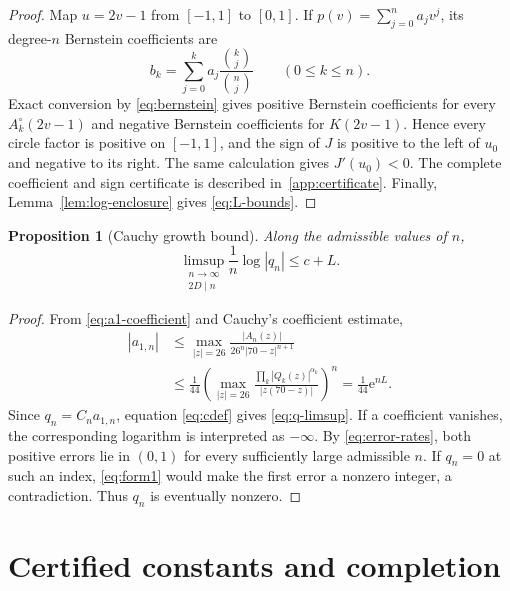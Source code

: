 \documentclass[preprint,12pt]{elsarticle}
\newtheorem{proposition}[theorem]{Proposition}
\theoremstyle{definition}
\newcommand{\e}{\mathrm e}
\begin{document}
\begin{proof}
Map $u=2v-1$ from $[-1,1]$ to $[0,1]$.  If
$p(v)=\sum_{j=0}^n a_j v^j$, its degree-$n$ Bernstein coefficients are
\begin{equation}\label{eq:bernstein}
 b_k=\sum_{j=0}^k a_j
 \frac{\binom{k}{j}}{\binom{n}{j}}
 \qquad(0\le k\le n).
\end{equation}
Exact conversion by \eqref{eq:bernstein} gives positive Bernstein
coefficients for every $A_k^\circ(2v-1)$ and negative Bernstein coefficients
for $K(2v-1)$.  Hence every circle factor is positive on $[-1,1]$, and the
sign of $J$ is positive to the left of $u_0$ and negative to its right.
The same calculation gives $J'(u_0)<0$.  The complete coefficient and sign
certificate is described in~\ref{app:certificate}.  Finally,
Lemma~\ref{lem:log-enclosure} gives \eqref{eq:L-bounds}.
\end{proof}

\begin{proposition}[Cauchy growth bound]\label{prop:cauchy}
Along the admissible values of $n$,
\begin{equation}\label{eq:q-limsup}
 \limsup_{\substack{n\to\infty\\2D\mid n}}
 \frac1n\log|q_n|
 \le c+L.
\end{equation}
\end{proposition}

\begin{proof}
From \eqref{eq:a1-coefficient} and Cauchy's coefficient estimate,
\[
\begin{aligned}
 |a_{1,n}|
 &\le
 \max_{|z|=26}
 \frac{|A_n(z)|}{26^n|70-z|^{n+1}}\\
 &\le\frac1{44}
 \left(
 \max_{|z|=26}
 \frac{\prod_k|Q_k(z)|^{\alpha_k}}{|z(70-z)|}
 \right)^n
 =\frac1{44}\e^{nL}.
\end{aligned}
\]
Since $q_n=C_n a_{1,n}$, equation \eqref{eq:cdef} gives
\eqref{eq:q-limsup}.  If a coefficient vanishes, the corresponding
logarithm is interpreted as $-\infty$.  By \eqref{eq:error-rates}, both
positive errors lie in $(0,1)$ for every sufficiently large admissible $n$.
If $q_n=0$ at such an index, \eqref{eq:form1} would make the first error a
nonzero integer, a contradiction.  Thus $q_n$ is eventually nonzero.
\end{proof}

\section{Certified constants and completion}\label{sec:completion}
\end{document}
